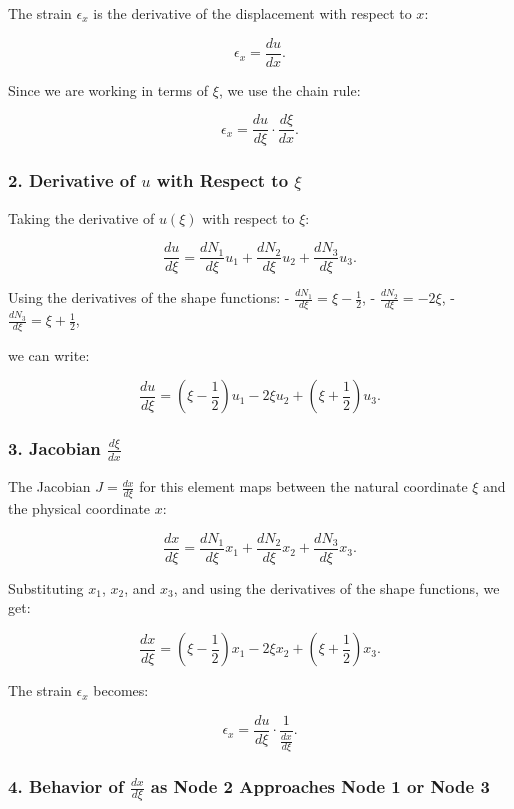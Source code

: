 The strain \( \epsilon_x \) is the derivative of the displacement with respect to \( x \):

\[
\epsilon_x = \frac{du}{dx}.
\]

Since we are working in terms of \( \xi \), we use the chain rule:

\[
\epsilon_x = \frac{du}{d\xi} \cdot \frac{d\xi}{dx}.
\]

\subsubsection*{2. Derivative of \( u \) with Respect to \( \xi \)}

Taking the derivative of \( u(\xi) \) with respect to \( \xi \):

\[
\frac{du}{d\xi} = \frac{dN_1}{d\xi} u_1 + \frac{dN_2}{d\xi} u_2 + \frac{dN_3}{d\xi} u_3.
\]

Using the derivatives of the shape functions:
- \( \frac{dN_1}{d\xi} = \xi - \frac{1}{2} \),
- \( \frac{dN_2}{d\xi} = -2\xi \),
- \( \frac{dN_3}{d\xi} = \xi + \frac{1}{2} \),

we can write:

\[
\frac{du}{d\xi} = \left( \xi - \frac{1}{2} \right) u_1 - 2\xi u_2 + \left( \xi + \frac{1}{2} \right) u_3.
\]

\subsubsection*{3. Jacobian \( \frac{d\xi}{dx} \)}

The Jacobian \( J = \frac{dx}{d\xi} \) for this element maps between the natural coordinate \( \xi \) and the physical coordinate \( x \):

\[
\frac{dx}{d\xi} = \frac{dN_1}{d\xi} x_1 + \frac{dN_2}{d\xi} x_2 + \frac{dN_3}{d\xi} x_3.
\]

Substituting \( x_1 \), \( x_2 \), and \( x_3 \), and using the derivatives of the shape functions, we get:

\[
\frac{dx}{d\xi} = \left( \xi - \frac{1}{2} \right) x_1 - 2\xi x_2 + \left( \xi + \frac{1}{2} \right) x_3.
\]

The strain \( \epsilon_x \) becomes:

\[
\epsilon_x = \frac{du}{d\xi} \cdot \frac{1}{\frac{dx}{d\xi}}.
\]

\subsubsection*{4. Behavior of \( \frac{dx}{d\xi} \) as Node 2 Approaches Node 1 or Node 3}

